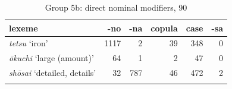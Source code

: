 \begin{table}[t!]
\centering
\begin{tabularx}{\textwidth}{Xrrrrr}
\lsptoprule
\textbf{lexeme} & \textbf{-no} & \textbf{-na} & \textbf{copula} & \textbf{case} & \textbf{-sa} \\
\midrule
\textit{tetsu} `iron’               & 1117 & 2   & 39 & 348 & 0 \\
\textit{ōkuchi} `large (amount)’    & 64   & 1   & 2  & 47  & 0 \\
\textit{shōsai} `detailed, details’ & 32   & 787 & 46 & 472 & 2 \\
\lspbottomrule
\end{tabularx}
\caption{Group 5b: direct nominal modifiers, 90}
\label{table group 5b}
\end{table}

~




